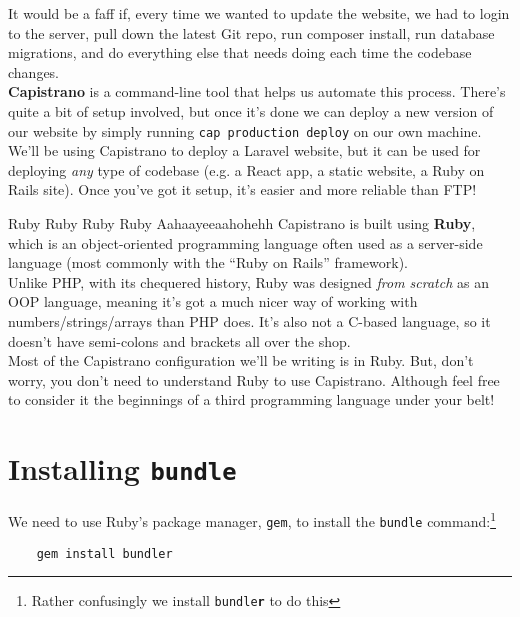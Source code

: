 It would be a faff if, every time we wanted to update the website, we had to login to the server, pull down the latest Git repo, run composer install, run database migrations, and do everything else that needs doing each time the codebase changes.
\\

\textbf{Capistrano} is a command-line tool that helps us automate this process. There's quite a bit of setup involved, but once it's done we can deploy a new version of our website by simply running \texttt{cap production deploy} on our own machine.
\\

We'll be using Capistrano to deploy a Laravel website, but it can be used for deploying \textit{any} type of codebase (e.g. a React app, a static website, a Ruby on Rails site). Once you've got it setup, it's easier and more reliable than FTP!


\begin{infobox}{Ruby Ruby Ruby Ruby Aahaayeeaahohehh}
    Capistrano is built using \textbf{Ruby}, which is an object-oriented programming language often used as a server-side language (most commonly with the ``Ruby on Rails'' framework).
    \\

    Unlike PHP, with its chequered history, Ruby was designed \textit{from scratch} as an OOP language, meaning it's got a much nicer way of working with numbers/strings/arrays than PHP does. It's also not a C-based language, so it doesn't have semi-colons and brackets all over the shop.
    \\

    Most of the Capistrano configuration we'll be writing is in Ruby. But, don't worry, you don't need to understand Ruby to use Capistrano. Although feel free to consider it the beginnings of a third programming language under your belt!
\end{infobox}


\section{Installing \texttt{bundle}}

We need to use Ruby's package manager, \texttt{gem}, to install the \texttt{bundle} command:\footnote{Rather confusingly we install \texttt{bundle\textbf{r}} to do this}

\begin{verbatim}
    gem install bundler
\end{verbatim}

